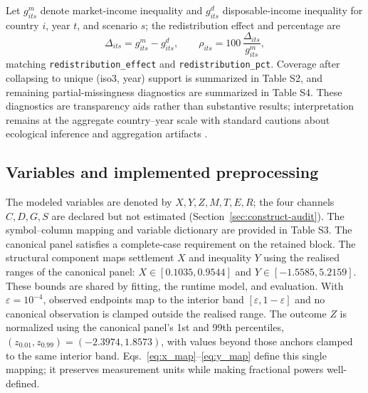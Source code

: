 \documentclass[11pt]{article}
\begin{document}
Let $g^{m}_{its}$ denote market-income inequality and $g^{d}_{its}$ disposable-income inequality for country $i$, year $t$, and scenario $s$; the redistribution effect and percentage are
\begin{equation*}
\Delta_{its} = g^{m}_{its} - g^{d}_{its},
\qquad
\rho_{its} = 100\,\frac{\Delta_{its}}{g^{m}_{its}},
\end{equation*}
matching \texttt{redistribution\_effect} and \texttt{redistribution\_pct}. Coverage after collapsing to unique (iso3, year) support is summarized in Table S2, and remaining partial-missingness diagnostics are summarized in Table S4. These diagnostics are transparency aids rather than substantive results; interpretation remains at the aggregate country--year scale with standard cautions about ecological inference and aggregation artifacts \parencite{Robinson1950Ecological,Openshaw1984MAUP}.

\subsection*{Variables and implemented preprocessing}\label{sec:measurement-validity}
The modeled variables are denoted by $X,Y,Z,M,T,E,R$; the four channels $C,D,G,S$ are declared but not estimated (Section~\ref{sec:construct-audit}). The symbol--column mapping and variable dictionary are provided in Table S3. The canonical panel satisfies a complete-case requirement on the retained block.
The structural component maps settlement $X$ and inequality $Y$ using the realised ranges of the canonical panel: $X\in[0.1035,0.9544]$ and $Y\in[-1.5585,5.2159]$. These bounds are shared by fitting, the runtime model, and evaluation. With $\varepsilon=10^{-4}$, observed endpoints map to the interior band $[\varepsilon,1-\varepsilon]$ and no canonical observation is clamped outside the realised range. The outcome $Z$ is normalized using the canonical panel's 1st and 99th percentiles, $(z_{0.01},z_{0.99})=(-2.3974,1.8573)$, with values beyond those anchors clamped to the same interior band. Eqs.~\eqref{eq:x_map}--\eqref{eq:y_map} define this single mapping; it preserves measurement units while making fractional powers well-defined.
\end{document}

